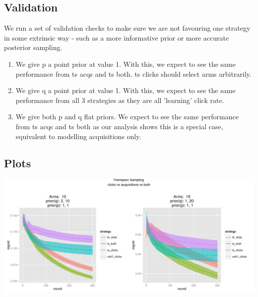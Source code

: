 \documentclass[11pt,a4,singlespacing,titlepagenumber=on]{scrreprt}
\numberwithin{equation}{chapter} %
\theoremstyle{remark}
\begin{document}
\subsection{Validation}

We run a set of validation checks to make sure we are not favouring one strategy in some extrinsic way - such as a more informative prior or more accurate posterior sampling.

\begin{enumerate}
	\item  We give p a point prior at value 1. With this, we expect to see the same performance from ts acqs and ts both. ts clicks should select arms arbitrarily.
	\item  We give q a point prior at value 1. With this, we expect to see the same performance from all 3 strategies as they are all 'learning' click rate.
	\item  We give both p and q flat priors. We expect to see the same performance from ts acqs and ts both as our analysis shows this is a special case, equivalent to modelling acquisitions only.
\end{enumerate}

\subsection{Plots}

\includegraphics[scale=0.5]{P4to5UCB}
\end{document}

